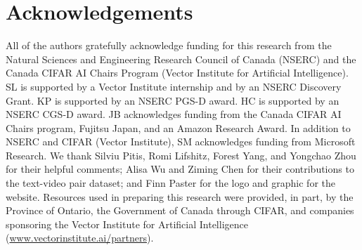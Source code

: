 \section*{Acknowledgements}
All of the authors gratefully acknowledge funding for this research from the Natural Sciences and Engineering Research Council of Canada (NSERC) and the Canada CIFAR AI Chairs Program (Vector Institute for Artificial Intelligence). 
SL is supported by a Vector Institute internship and by an NSERC Discovery Grant. KP is supported by an NSERC PGS-D award. 
HC is supported by an NSERC CGS-D award.
JB acknowledges funding from the Canada CIFAR AI Chairs program, Fujitsu Japan, and an Amazon Research Award. In addition to NSERC and CIFAR (Vector Institute), SM acknowledges funding from Microsoft Research.
We thank Silviu Pitis, Romi Lifshitz, Forest Yang, and Yongchao Zhou for their helpful comments; Alisa Wu and Ziming Chen for their contributions to the text-video pair dataset; and Finn Paster for the logo and graphic for the website.
Resources used in preparing this research were provided, in part, by the Province of Ontario, the Government of Canada through CIFAR, and companies sponsoring the Vector Institute for Artificial Intelligence
(\url{www.vectorinstitute.ai/partners}). 